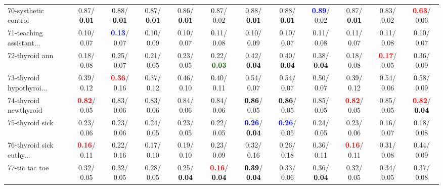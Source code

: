 \begin{table}[h]
\begin{center}
{\begin{tabular}{lc|c|c|c|c|c|c|c|c|c|c}
70-systhetic control &   0.87/\textcolor{black}{\textbf{  0.01}} &   0.88/\textcolor{black}{\textbf{  0.01}} &   0.87/\textcolor{black}{\textbf{  0.01}} &   0.86/\textcolor{black}{\textbf{  0.01}} &   0.87/  0.02 &   0.88/\textcolor{black}{\textbf{  0.01}} &   0.88/\textcolor{black}{\textbf{  0.01}} & \textcolor{blue}{\textbf{  0.89}}/  0.02 &   0.87/\textcolor{black}{\textbf{  0.01}} &   0.83/  0.02 & \textcolor{red}{\textbf{  0.63}}/  0.06 \\
71-teaching assistant... &   0.10/  0.07 & \textcolor{blue}{\textbf{  0.13}}/  0.07 &   0.10/  0.09 &   0.10/  0.07 &   0.11/  0.08 &   0.10/  0.09 &   0.10/  0.07 &   0.11/  0.08 &   0.11/  0.07 &   0.11/  0.08 &   0.10/  0.07 \\ \hline
72-thyroid ann &   0.18/  0.08 &   0.25/  0.07 &   0.21/  0.05 &   0.23/  0.05 &   0.22/\textcolor{darkgreen}{\textbf{  0.03}} &   0.42/\textcolor{black}{\textbf{  0.04}} &   0.40/\textcolor{black}{\textbf{  0.04}} &   0.38/\textcolor{black}{\textbf{  0.04}} &   0.18/  0.08 & \textcolor{red}{\textbf{  0.17}}/  0.05 &   0.36/  0.09 \\
73-thyroid hypothyroi... &   0.39/  0.12 & \textcolor{red}{\textbf{  0.36}}/  0.16 &   0.37/  0.12 &   0.46/  0.10 &   0.40/  0.11 &   0.54/  0.07 &   0.54/  0.07 &   0.50/  0.07 &   0.39/  0.12 &   0.54/  0.06 &   0.58/  0.09 \\
74-thyroid newthyroid & \textcolor{red}{\textbf{  0.82}}/  0.05 &   0.83/  0.06 &   0.83/  0.06 &   0.84/  0.06 &   0.84/  0.06 & \textcolor{black}{\textbf{  0.86}}/  0.05 & \textcolor{black}{\textbf{  0.86}}/  0.05 &   0.85/  0.05 & \textcolor{red}{\textbf{  0.82}}/  0.05 &   0.85/  0.05 & \textcolor{red}{\textbf{  0.82}}/\textcolor{black}{\textbf{  0.04}} \\
75-thyroid sick &   0.23/  0.06 &   0.23/  0.06 &   0.24/  0.05 &   0.23/  0.05 &   0.22/  0.05 & \textcolor{blue}{\textbf{  0.26}}/\textcolor{black}{\textbf{  0.04}} & \textcolor{blue}{\textbf{  0.26}}/  0.05 &   0.24/  0.05 &   0.23/  0.06 &   0.16/  0.07 &   0.18/  0.08 \\
76-thyroid sick euthy... & \textcolor{red}{\textbf{  0.16}}/  0.11 &   0.22/  0.16 &   0.17/  0.10 &   0.19/  0.10 &   0.23/  0.09 &   0.32/  0.16 &   0.26/  0.18 &   0.36/  0.11 & \textcolor{red}{\textbf{  0.16}}/  0.11 &   0.31/  0.08 &   0.44/  0.09 \\
77-tic tac toe &   0.32/  0.05 &   0.32/  0.05 &   0.28/  0.05 &   0.25/\textcolor{black}{\textbf{  0.04}} & \textcolor{red}{\textbf{  0.16}}/\textcolor{black}{\textbf{  0.04}} & \textcolor{black}{\textbf{  0.39}}/\textcolor{black}{\textbf{  0.04}} &   0.33/  0.06 &   0.36/\textcolor{black}{\textbf{  0.04}} &   0.32/  0.05 &   0.34/  0.05 &   0.37/  0.08 \\

\end{tabular}}
\end{center}
\end{table}
